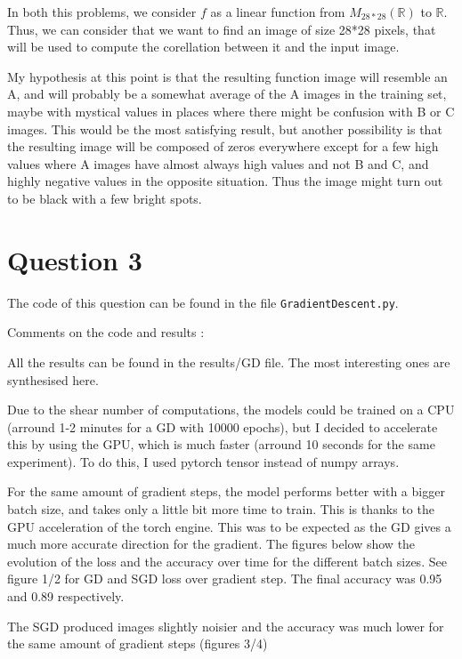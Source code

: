 \documentclass{article}
\begin{document}
In both this problems, we consider $f$ as a linear function from $M_{28*28}(\mathbb{R})$ to $\mathbb{R}$. Thus, we can consider that we want to find an image of size 28*28 pixels, that will be used to compute the corellation between it and the input image.

My hypothesis at this point is that the resulting function image will resemble an A, and will probably be a somewhat average of the A images in the training set, maybe with mystical values in places where there might be confusion with B or C images. This would be the most satisfying result, but another possibility is that the resulting image will be composed of zeros everywhere except for a few high values where A images have almost always high values and not B and C, and highly negative values in the opposite situation. Thus the image might turn out to be black with a few bright spots.

\section{Question 3}

The code of this question can be found in the file \texttt{GradientDescent.py}.\newline

Comments on the code and results :\newline

All the results can be found in the results/GD file. The most interesting ones are synthesised here.

Due to the shear number of computations, the models could be trained on a CPU (arround 1-2 minutes for a GD with 10000 epochs), but I decided to accelerate this by using the GPU, which is much faster (arround 10 seconds for the same experiment). To do this, I used pytorch tensor instead of numpy arrays.

For the same amount of gradient steps, the model performs better with a bigger batch size, and takes only a little bit more time to train. This is thanks to the GPU acceleration of the torch engine.
This was to be expected as the GD gives a much more accurate direction for the gradient.
The figures below show the evolution of the loss and the accuracy over time for the different batch sizes.
See figure 1/2 for GD and SGD loss over gradient step. The final accuracy was 0.95 and 0.89 respectively.

The SGD produced images slightly noisier and the accuracy was much lower for the same amount of gradient steps (figures 3/4)\newline
\end{document}
